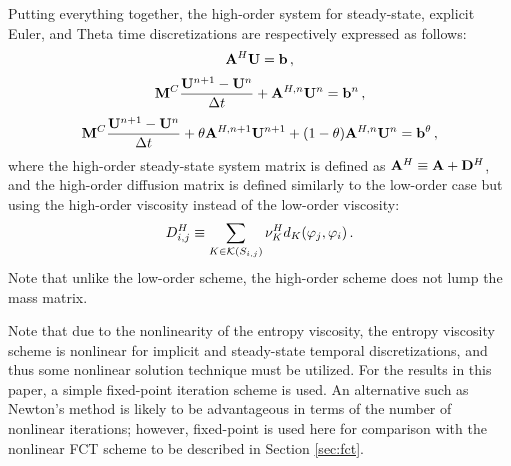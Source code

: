 Putting everything together, the high-order system for steady-state,
explicit Euler, and Theta time discretizations are respectively expressed
as follows:
\begin{equation}\label{eq:high_ss}
  \mathbf{A}^H \mathbf{U} = \mathbf{b} \,,
\end{equation}
\begin{equation}\label{eq:high_fe}
  \mathbf{M}^C\frac{\mathbf{U}^{n+1} - \mathbf{U}^n}{\Delta t} + \mathbf{A}^{H,n}\mathbf{U}^n = \mathbf{b}^n \,,
\end{equation}
\begin{equation}\label{eq:high_theta}
  \mathbf{M}^C\frac{\mathbf{U}^{n+1} - \mathbf{U}^n}{\Delta t} + \theta\mathbf{A}^{H,n+1}\mathbf{U}^{n+1}
    + (1-\theta)\mathbf{A}^{H,n}\mathbf{U}^n
    = \mathbf{b}^\theta \,,
\end{equation}
where the high-order steady-state system matrix is defined as
$\mathbf{A}^H\equiv\mathbf{A} + \mathbf{D}^H$, and the high-order diffusion matrix is defined similarly
to the low-order case but using the high-order viscosity instead of the low-order
viscosity:
\begin{equation}\label{eq:high_order_diffusion_matrix}
  D_{i,j}^H \equiv
    \sum\limits_{K\in \mathcal{K}(S_{i,j})}\nu^H_K
    d_K(\varphi_j,\varphi_i) \,.
\end{equation}
Note that unlike the low-order scheme, the high-order scheme does not lump the
mass matrix.

\begin{rmk}
Note that due to the nonlinearity of the entropy viscosity, the entropy viscosity
scheme is nonlinear for implicit and steady-state temporal discretizations, and
thus some nonlinear solution technique must be utilized. For the results in
this paper, a simple fixed-point iteration scheme is used. An alternative
such as Newton's method is likely to be advantageous in terms of the number
of nonlinear iterations; however, fixed-point is used here for comparison
with the nonlinear FCT scheme to be described in Section \ref{sec:fct}.
\end{rmk}
